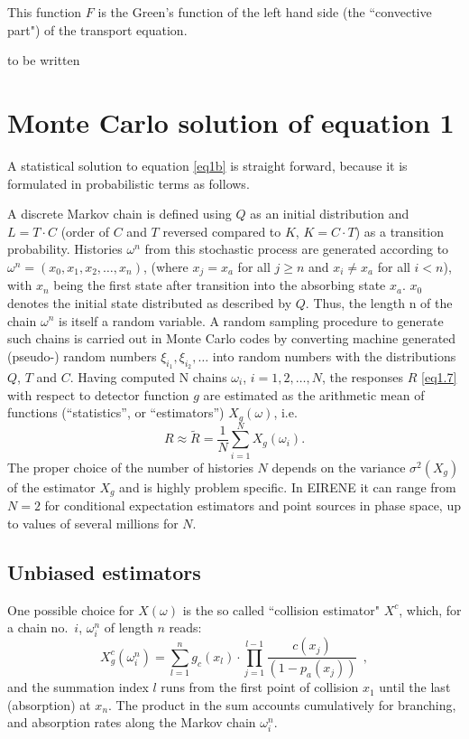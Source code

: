 This function $F$ is the Green's function of the left hand side (the
``convective part") of the transport equation.
\bigskip

to be written

\newpage

\section{Monte Carlo solution of equation 1} \label{sec1.2}

A statistical solution to equation \cref{eq1b} is straight forward, because it
is formulated in probabilistic terms as follows.

A discrete Markov chain is defined using $Q$ as an initial distribution and $L
  = T  \cdot  C$ (order of $C$ and $T$ reversed compared to $K$, $K = C \cdot T$)
as a transition probability.
Histories $\omega^n$ from this stochastic process are generated according to
$\omega^n = (x_0, x_1, x_2, \dots, x_n)$, (where $x_j = x_a $ for all $ j   \ge
  n$ and $ x_i	    \ne   x_a $ for all $ i   <   n$), with $x_n$ being the
first state after transition into the absorbing state $x_a$.
$ x_0$ denotes the initial state distributed as described by $Q$.
Thus, the length n of the chain $ \omega^n$ is itself a random variable.
A random sampling procedure to generate such chains is carried out in Monte
Carlo codes by converting machine generated (pseudo-) random numbers $
  \xi_{i_1}, \xi_{i_2} , \dots$ into random numbers with the distributions $Q$,
$T$ and $C$.
Having computed N  chains $ \omega_i$, $i = 1, 2, \dots, N$, the responses $R$
\cref{eq1.7} with respect to detector function $g$ are estimated as the
arithmetic mean of functions (``statistics'', or  ``estimators'') $X_g(\omega
  )$, i.e.
\begin{equation}
  \label{eq1.8} R  \approx   \tilde{R} = \frac{1}{N}
  \sum_{i=1}^{N}	X_g(\omega_i) .
\end{equation}
The proper choice of the number of histories $N$ depends on the variance
$\sigma^2(X_g)$ of the estimator $X_g$ and is highly problem specific.
In EIRENE it can range from $N=2$ for conditional expectation estimators and
point sources in phase space, up to values of several millions for $N$.

\subsection{Unbiased estimators}\label{sec1.2.a}

One possible choice for $X(\omega )$ is the so called ``collision estimator"
$X^c$, which, for a chain no.\ $i$,  $\omega_i^n$ of length $n$ reads:
\begin{equation}
  \label{eq1.9}
  X^c_g ( \omega^n_i) = \sum_{l=1}^{n} g_c (x_l ) \cdot	\prod_{j=1}^{l-1}
  \frac{c(x_j )}{(1 - p_a(x_j))}	       \ \ ,
\end{equation}
and the summation
index $l$ runs from the first point of collision $x_1$ until the last
(absorption) at $x_n$.
The product in the sum accounts cumulatively for branching, and absorption
rates along the Markov chain $\omega_i^n$.

